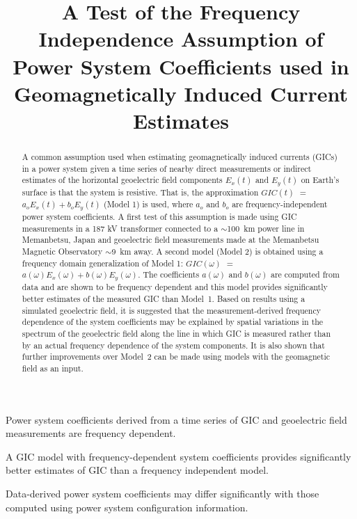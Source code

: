 \documentclass[draft,linenumbers]{agujournal2018}
\begin{document}
\title{A Test of the Frequency Independence Assumption of Power System Coefficients used in Geomagnetically Induced Current Estimates}





\begin{keypoints}
\item Power system coefficients derived from a time series of GIC and geoelectric field measurements are frequency dependent.
\item A GIC model with frequency-dependent system coefficients provides significantly better estimates of GIC than a frequency independent model.
\item Data-derived power system coefficients may differ significantly with those computed using power system configuration information.
\end{keypoints}

\begin{abstract}
A common assumption used when estimating geomagnetically induced currents (GICs) in a power system given a time series of nearby direct measurements or indirect estimates of the horizontal geoelectric field components $E_x(t)$ and $E_y(t)$ on Earth's surface is that the system is resistive. That is, the approximation $GIC(t)$  $=$ $a_oE_x(t) + b_oE_y(t)$ (Model 1) is used, where $a_o$ and $b_o$ are frequency-independent power system coefficients.  A first test of this assumption is made using GIC measurements in a 187 kV transformer connected to a $\sim$100~km power line in Memanbetsu, Japan and geoelectric field measurements made at the Memanbetsu Magnetic Observatory $\sim$9~km away. A second model (Model 2) is obtained using a frequency domain generalization of Model 1: $GIC(\omega)$ $=$ $a(\omega)E_x(\omega) + b(\omega)E_y(\omega)$. The coefficients $a(\omega)$ and $b(\omega)$ are computed from data and are shown to be frequency dependent and this model provides significantly better estimates of the measured GIC than Model~1. Based on results using a simulated geoelectric field, it is suggested that the measurement-derived frequency dependence of the system coefficients may be explained by spatial variations in the spectrum of the geoelectric field along the line in which GIC is measured rather than by an actual frequency dependence of the system components. It is also shown that further improvements over Model~2 can be made using models with the geomagnetic field as an input.
\end{abstract}
\end{document}
